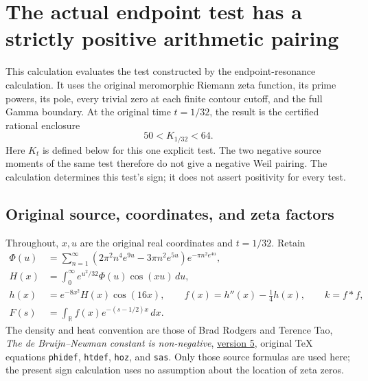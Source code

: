 \section{The actual endpoint test has a strictly positive arithmetic pairing}

This calculation evaluates the test constructed by the endpoint-resonance
calculation. It uses the original meromorphic Riemann zeta function,
its prime powers, its pole, every trivial zero at each finite contour
cutoff, and the full Gamma boundary. At the original time \(t=1/32\),
the result is the certified rational enclosure
\[
 \boxed{50<K_{1/32}<64.}\tag{AP1}
\]
Here \(K_t\) is defined below for this one explicit test. The two
negative source moments of the same test therefore do not give a
negative Weil pairing. The calculation determines this test's sign;
it does not assert positivity for every test.

\subsection{Original source, coordinates, and zeta factors}
Throughout, \(x,u\) are the original real coordinates and
\(t=1/32\). Retain
\[
\begin{split}
 \Phi(u)&=\sum_{n=1}^\infty
 (2\pi^2n^4e^{9u}-3\pi n^2e^{5u})e^{-\pi n^2e^{4u}},\\
 H(x)&=\int_0^\infty e^{u^2/32}\Phi(u)\cos(xu)\,du,\\
 h(x)&=e^{-8x^2}H(x)\cos(16x),\qquad
 f(x)=h''(x)-\tfrac14h(x),\qquad k=f*f,\\
 F(s)&=\int_{\mathbb R}f(x)e^{-(s-1/2)x}\,dx.
\end{split}\tag{AP2}
\]
The density and heat convention are those of Brad Rodgers and Terence
Tao, \emph{The de Bruijn--Newman constant is non-negative},
\href{https://arxiv.org/abs/1801.05914v5}{version 5}, original TeX
equations \texttt{phidef}, \texttt{htdef}, \texttt{hoz}, and
\texttt{sas}. Only those source formulas are used here; the present
sign calculation uses no assumption about the location of zeta zeros.

